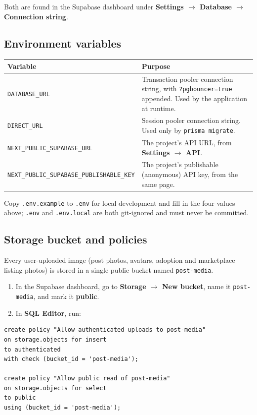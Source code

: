 \documentclass[11pt,a4paper]{article}
\begin{document}
Both are found in the Supabase dashboard under \textbf{Settings $\to$ Database
$\to$ Connection string}.

\subsection{Environment variables}
\begin{longtable}{@{}p{4.6cm}p{9.4cm}@{}}
\toprule
\textbf{Variable} & \textbf{Purpose} \\
\midrule
\endhead
\texttt{DATABASE\_URL} & Transaction pooler connection string, with
  \texttt{?pgbouncer=true} appended. Used by the application at runtime. \\
\texttt{DIRECT\_URL} & Session pooler connection string. Used only by
  \texttt{prisma migrate}. \\
\texttt{NEXT\_PUBLIC\_SUPABASE\_URL} & The project's API URL, from
  \textbf{Settings $\to$ API}. \\
\texttt{NEXT\_PUBLIC\_SUPABASE\_PUBLISHABLE\_KEY} & The project's publishable
  (anonymous) API key, from the same page. \\
\bottomrule
\end{longtable}

Copy \texttt{.env.example} to \texttt{.env} for local development and fill in the four
values above; \texttt{.env} and \texttt{.env.local} are both git-ignored and must never
be committed.

\subsection{Storage bucket and policies}
Every user-uploaded image (post photos, avatars, adoption and marketplace listing
photos) is stored in a single public bucket named \texttt{post-media}.

\begin{enumerate}[leftmargin=*]
  \item In the Supabase dashboard, go to \textbf{Storage $\to$ New bucket}, name it
        \texttt{post-media}, and mark it \textbf{public}.
  \item In \textbf{SQL Editor}, run:
\end{enumerate}

\begin{lstlisting}
create policy "Allow authenticated uploads to post-media"
on storage.objects for insert
to authenticated
with check (bucket_id = 'post-media');

create policy "Allow public read of post-media"
on storage.objects for select
to public
using (bucket_id = 'post-media');
\end{lstlisting}
\end{document}
